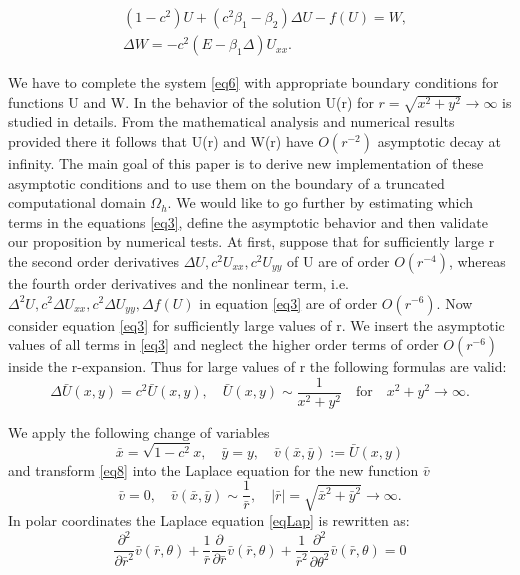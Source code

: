 \documentclass[12pt]{article}
\theoremstyle{theorem}
\theoremstyle{defi}
\begin{document}
\begin{equation}\label{eq6}
\begin{split}
&(1-c^2) U + ( c^2\beta_1 -  \beta_2) \Delta U  - f (U) = W, \\ 
&\Delta W =  -c^2  (E- \beta_1 \Delta) U_{xx}. 
\end{split}
\end{equation}

We have to complete the system \ref{eq6} with appropriate boundary conditions for functions U and W. In \cite{ref6} the behavior of the solution U(r) for  $ r=\sqrt{x^2 + y^2}\rightarrow \infty$ is studied in details. From the mathematical analysis and numerical results provided there it follows that U(r) and W(r) have  $O(r^{-2})$ asymptotic decay at infinity. 
The main goal of this paper is to derive new implementation of these asymptotic conditions and to use them on the boundary of a truncated computational domain $\Omega_h$.
	We would like to go further by estimating which terms in the equations \ref{eq3},  define the asymptotic behavior and then validate our proposition by numerical tests. At first, suppose that for sufficiently large r the second order derivatives $\Delta U , c^2U_{xx} , c^2U_{yy}$  of U are of order  $O(r^{-4})$, whereas the fourth order derivatives and the nonlinear term, i.e.  $\Delta^2 U , c^2\Delta U_{xx} , c^2\Delta U_{yy}, \Delta f(U)$    in equation \ref{eq3} are of order $O(r^{-6})$.  
Now consider equation \ref{eq3} for sufficiently large values of r. We insert the asymptotic values of all terms in \ref{eq3} and neglect the higher order terms of order $O(r^{-6})$ inside the r-expansion. Thus for large values of r the following formulas are valid:
\begin{equation}
 \Delta \bar{U}(x,y) =   c^2   \bar{U}(x,y) , \quad  \bar{U}(x,y) \sim \frac{1}{x^2 + y^2} \quad \text{for} \quad x^2 + y^2 \rightarrow \infty  . \label{eq8}
\end{equation}


We apply the following change of variables
\begin{equation}
\bar{x} = \sqrt{1-c^2}x , \quad  \bar{y} = y, \quad \bar{v}( \bar{x}, \bar{y}) := \bar{U} (x, y)\label{eqVC}
\end{equation}
and transform \ref{eq8} into the Laplace equation for the new function $\bar{v}$
\begin{equation} \label{eqLap}
\bar{v} = 0, \quad \bar{v}( \bar{x}, \bar{y}) \sim \frac{1}{\bar{r}}, \quad |\bar{r}|=\sqrt{\bar{x}^2 + \bar{y}^2} \rightarrow \infty.
\end{equation}
In polar coordinates the Laplace equation \ref{eqLap} is rewritten as:
\begin{equation} \label{eqLapPol}
\frac{\partial^2}{\partial \bar{r}^2} \bar{v}(\bar{r}, \theta) + \frac{1}{\bar{r}} \frac{\partial}{\partial \bar{r}}\bar{v}(\bar{r}, \theta) +  \frac{1}{\bar{r}^2} \frac{\partial^2}{\partial \theta^2} \bar{v}(\bar{r}, \theta) = 0
\end{equation}
\end{document}
